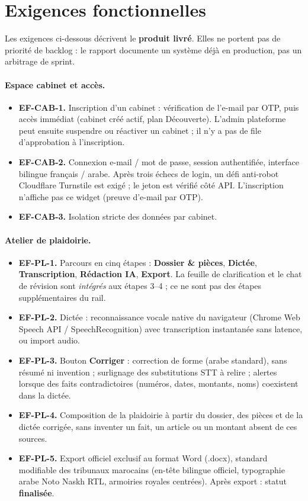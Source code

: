 \section{Exigences fonctionnelles}

Les exigences ci-dessous décrivent le \textbf{produit livré}. Elles ne portent pas de priorité de backlog : le rapport documente un système déjà en production, pas un arbitrage de sprint.

\paragraph{Espace cabinet et accès.}
\begin{itemize}[leftmargin=1.4em]
  \item \textbf{EF-CAB-1.} Inscription d'un cabinet : vérification de l'e-mail par OTP, puis accès immédiat (cabinet créé actif, plan Découverte). L'admin plateforme peut ensuite suspendre ou réactiver un cabinet ; il n'y a pas de file d'approbation à l'inscription.
  \item \textbf{EF-CAB-2.} Connexion e-mail / mot de passe, session authentifiée, interface bilingue français / arabe. Après trois échecs de login, un défi anti-robot Cloudflare Turnstile est exigé ; le jeton est vérifié côté API. L'inscription n'affiche pas ce widget (preuve d'e-mail par OTP).
  \item \textbf{EF-CAB-3.} Isolation stricte des données par cabinet.
\end{itemize}

\paragraph{Atelier de plaidoirie.}
\begin{itemize}[leftmargin=1.4em]
  \item \textbf{EF-PL-1.} Parcours en cinq étapes : \textbf{Dossier \& pièces}, \textbf{Dictée}, \textbf{Transcription}, \textbf{Rédaction IA}, \textbf{Export}. La feuille de clarification et le chat de révision sont \emph{intégrés} aux étapes 3--4 ; ce ne sont pas des étapes supplémentaires du rail.
  \item \textbf{EF-PL-2.} Dictée : reconnaissance vocale native du navigateur (Chrome Web Speech API / SpeechRecognition) avec transcription instantanée sans latence, ou import audio.
  \item \textbf{EF-PL-3.} Bouton \textbf{Corriger} : correction de forme (arabe standard), sans résumé ni invention ; surlignage des substitutions STT à relire ; alertes lorsque des faits contradictoires (numéros, dates, montants, noms) coexistent dans la dictée.
  \item \textbf{EF-PL-4.} Composition de la plaidoirie à partir du dossier, des pièces et de la dictée corrigée, sans inventer un fait, un article ou un montant absent de ces sources.
  \item \textbf{EF-PL-5.} Export officiel exclusif au format Word (.docx), standard modifiable des tribunaux marocains (en-tête bilingue officiel, typographie arabe Noto Naskh RTL, armoiries royales centrées). Après export : statut \textbf{finalisée}.
\end{itemize}

